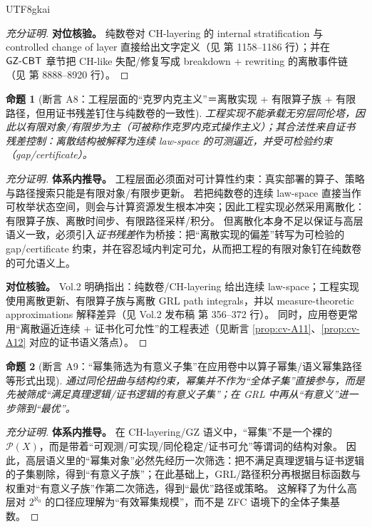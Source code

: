 \documentclass[12pt]{article}
\newtheorem{proposition}{命题}[section]
\begin{document}
\begin{CJK*}{UTF8}{gkai}
\begin{proof}[充分证明]
\textbf{对位核验。}
纯数卷对 CH-layering 的 internal stratification 与 controlled change of layer 直接给出文字定义（见 \cite{GaoZheng2025GFramework} 第
  1158--1186 行）；并在 $\mathsf{GZ\text{-}CBT}$ 章节把 CH-like 失配/修复写成 breakdown + rewriting 的离散事件链（见 \cite{GaoZheng2025GFramework} 第
  8888--8920 行）。
\end{proof}

\begin{proposition}[断言 A8：工程层面的“克罗内克主义”＝离散实现 + 有限算子族 + 有限路径，但用证书残差钉住与纯数卷的一致性]\label{prop:cv-A8}
工程实现不能承载无穷层同伦塔，因此以有限对象/有限步为主（可被称作克罗内克式操作主义）；其合法性来自证书残差控制：离散结构被解释为连续 law-space 的可测逼近，并受可检验约束（gap/certificate）。
\end{proposition}

\begin{proof}[充分证明]
\textbf{体系内推导。}
工程层面必须面对可计算性约束：真实部署的算子、策略与路径搜索只能是有限对象/有限步更新。
若把纯数卷的连续 law-space 直接当作可枚举状态空间，则会与计算资源发生根本冲突；因此工程实现必然采用离散化：有限算子族、离散时间步、有限路径采样/积分。
但离散化本身不足以保证与高层语义一致，必须引入\emph{证书残差}作为桥接：把“离散实现的偏差”转写为可检验的 gap/certificate 约束，并在容忍域内判定可允，从而把工程的有限对象钉在纯数卷的可允语义上。

\textbf{对位核验。}
Vol.2 明确指出：纯数卷/CH-layering 给出连续 law-space；工程实现使用离散更新、有限算子族与离散 GRL path integrals，并以 measure-theoretic approximations
  解释差异（见 Vol.2 发布稿\cite{GaoZhengAppVol2} 第 356--372 行）。
同时，应用卷更常用“离散逼近连续 + 证书化可允性”的工程表述（见断言 \ref{prop:cv-A11}、\ref{prop:cv-A12} 对应的证书语义落点）。
\end{proof}

\begin{proposition}[断言 A9：“幂集筛选为有意义子集”在应用卷中以算子幂集/语义幂集路径等形式出现]\label{prop:cv-A9}
通过同伦扭曲与结构约束，幂集并不作为“全体子集”直接参与，而是先被筛成“满足真理逻辑/证书逻辑的有意义子集”；在 GRL 中再从“有意义”进一步筛到“最优”。
\end{proposition}

\begin{proof}[充分证明]
\textbf{体系内推导。}
在 CH-layering/GZ 语义中，“幂集”不是一个裸的 $\mathcal P(X)$，而是带着“可观测/可实现/同伦稳定/证书可允”等谓词的结构对象。
因此，高层语义里的“幂集对象”必然先经历一次筛选：把不满足真理逻辑与证书逻辑的子集剔除，得到“有意义子族”；在此基础上，GRL/路径积分再根据目标函数与权重对“有意义子族”作第二次筛选，得到“最优”路径或策略。
这解释了为什么高层对 $2^{\aleph_0}$ 的口径应理解为“有效幂集规模”，而不是 ZFC 语境下的全体子集基数。


\end{proof}
\end{CJK*}
\end{document}
